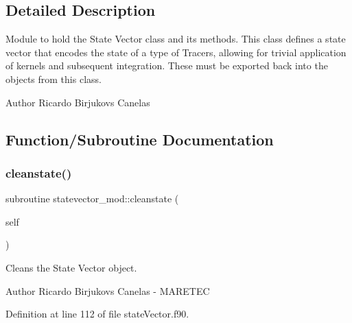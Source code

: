 \subsection{Detailed Description}
Module to hold the State Vector class and its methods. This class defines a state vector that encodes the state of a type of Tracers, allowing for trivial application of kernels and subsequent integration. These must be exported back into the objects from this class. 

\begin{DoxyAuthor}{Author}
Ricardo Birjukovs Canelas 
\end{DoxyAuthor}


\subsection{Function/\+Subroutine Documentation}
\mbox{\label{namespacestatevector__mod_acb2d2a7c4c5ee5d86a601be7db58c1df}} 
\subsubsection{\texorpdfstring{cleanstate()}{cleanstate()}}
{\footnotesize\ttfamily subroutine statevector\+\_\+mod\+::cleanstate (\begin{DoxyParamCaption}\item[{class(\mbox{\hyperlink{structstatevector__mod_1_1statevector__class}{statevector\+\_\+class}}), intent(inout)}]{self }\end{DoxyParamCaption})\hspace{0.3cm}{\ttfamily [private]}}



Cleans the State Vector object. 

\begin{DoxyAuthor}{Author}
Ricardo Birjukovs Canelas -\/ M\+A\+R\+E\+T\+EC 
\end{DoxyAuthor}


Definition at line 112 of file state\+Vector.\+f90.


